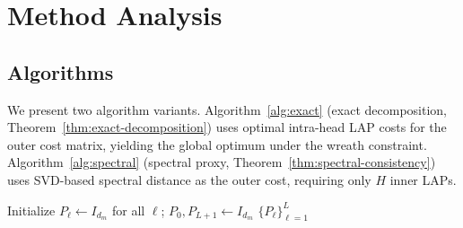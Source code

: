 \section{Method Analysis}
\label{sec:method}

\subsection{Algorithms}

We present two algorithm variants. Algorithm~\ref{alg:exact} (exact decomposition, Theorem~\ref{thm:exact-decomposition}) uses optimal intra-head LAP costs for the outer cost matrix, yielding the global optimum under the wreath constraint. Algorithm~\ref{alg:spectral} (spectral proxy, Theorem~\ref{thm:spectral-consistency}) uses SVD-based spectral distance as the outer cost, requiring only $H$ inner LAPs.

\begin{algorithm}[htbp]
    \caption{Wreath Alignment (Exact Decomposition)}
    \label{alg:exact}
    \BlankLine
    Initialize $P_\ell \leftarrow I_{d_m}$ for all $\ell$; $P_0, P_{L+1} \leftarrow I_{d_m}$\;
    \Return $\{P_\ell\}_{\ell=1}^{L}$\;
\end{algorithm}

